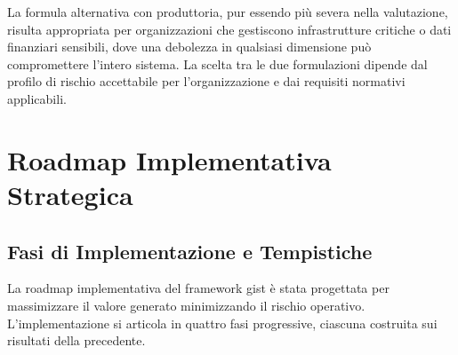La formula alternativa con produttoria, pur essendo più severa nella valutazione, risulta appropriata per organizzazioni che gestiscono infrastrutture critiche o dati finanziari sensibili, dove una debolezza in qualsiasi dimensione può compromettere l'intero sistema. La scelta tra le due formulazioni dipende dal profilo di rischio accettabile per l'organizzazione e dai requisiti normativi applicabili.

\section{\texorpdfstring{Roadmap Implementativa Strategica}{5.4 - Roadmap Implementativa Strategica}}
\label{sec:5.4}

\subsection{\texorpdfstring{Fasi di Implementazione e Tempistiche}{5.4.1 - Fasi di Implementazione e Tempistiche}}
\label{subsec:5.4.1}

La roadmap implementativa del framework \gls{gist} è stata progettata per massimizzare il valore generato minimizzando il rischio operativo. L'implementazione si articola in quattro fasi progressive, ciascuna costruita sui risultati della precedente.

